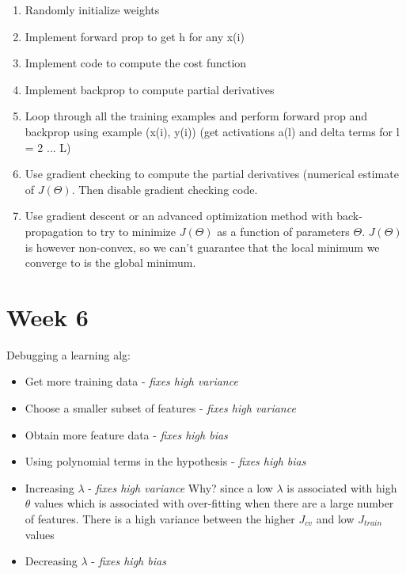\documentclass{article}
\begin{document}
\begin{enumerate}
    \item Randomly initialize weights
    \item Implement forward prop to get h for any x(i)
    \item Implement code to compute the cost function
    \item Implement backprop to compute partial derivatives
    \item Loop through all the training examples and perform forward prop and backprop using example (x(i), y(i))
        (get activations a(l) and delta terms for l = 2 ... L)
        
    \item Use gradient checking to compute the partial derivatives (numerical estimate of $J(\Theta)$. Then disable gradient checking code.
    \item Use gradient descent or an advanced optimization method with back-propagation to try to minimize $J(\Theta)$ as a function of parameters $\Theta$. $J(\Theta)$ is however non-convex, so we can't guarantee that the local minimum we converge to is the global minimum.
\end{enumerate}




\section{Week 6}

Debugging a learning alg:

\begin{itemize}
    \item Get more training data - \emph{fixes high variance}
    \item Choose a smaller subset of features - \emph{fixes high variance}
    \item Obtain more feature data - \emph{fixes high bias}
    \item Using polynomial terms in the hypothesis - \emph{fixes high bias}
    \item Increasing $\lambda$ - \emph{fixes high variance} Why? since a low $\lambda$ is associated with high $\theta$ values which is associated with over-fitting when there are a large number of features. There is a high variance between the higher $J_{cv}$ and low $J_{train}$ values
    \item Decreasing $\lambda$ - \emph{fixes high bias}
\end{itemize}
\end{document}
